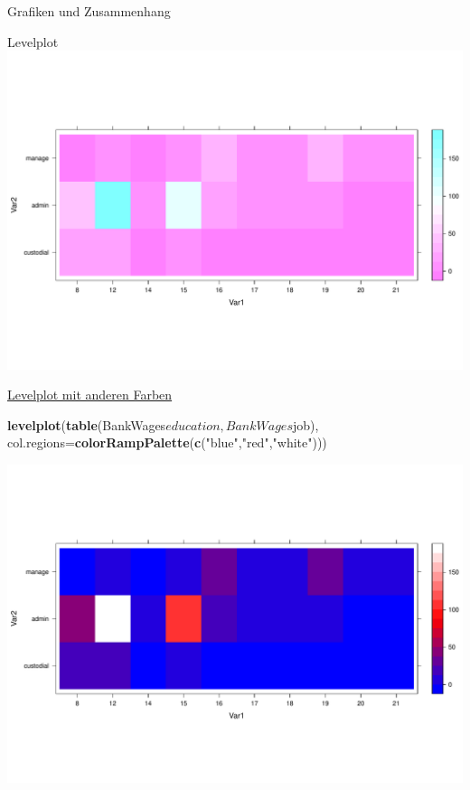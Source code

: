 \documentclass[ignorenonframetext,]{beamer}
\newenvironment{Shaded}{}{}
\newcommand{\KeywordTok}[1]{\textcolor[rgb]{0.00,0.44,0.13}{\textbf{{#1}}}}
\newcommand{\DataTypeTok}[1]{\textcolor[rgb]{0.56,0.13,0.00}{{#1}}}
\newcommand{\StringTok}[1]{\textcolor[rgb]{0.25,0.44,0.63}{{#1}}}
\newcommand{\NormalTok}[1]{{#1}}
\begin{document}
\begin{frame}[fragile]{Grafiken und Zusammenhang}
\begin{block}{Levelplot}
\includegraphics{R_intern_files/figure-beamer/unnamed-chunk-212-1.pdf}

\end{block}

\begin{block}{\href{http://r.789695.n4.nabble.com/adjusting-levelplot-color-scale-to-data-td3997342.html}{Levelplot
mit anderen Farben}}

\begin{Shaded}
\begin{Highlighting}[]
\KeywordTok{levelplot}\NormalTok{(}\KeywordTok{table}\NormalTok{(BankWages$education,BankWages$job),}
          \DataTypeTok{col.regions=}\KeywordTok{colorRampPalette}\NormalTok{(}\KeywordTok{c}\NormalTok{(}\StringTok{"blue"}\NormalTok{,}\StringTok{"red"}\NormalTok{,}\StringTok{"white"}\NormalTok{)))}
\end{Highlighting}
\end{Shaded}

\includegraphics{R_intern_files/figure-beamer/unnamed-chunk-213-1.pdf}


\end{block}
\end{frame}
\end{document}
